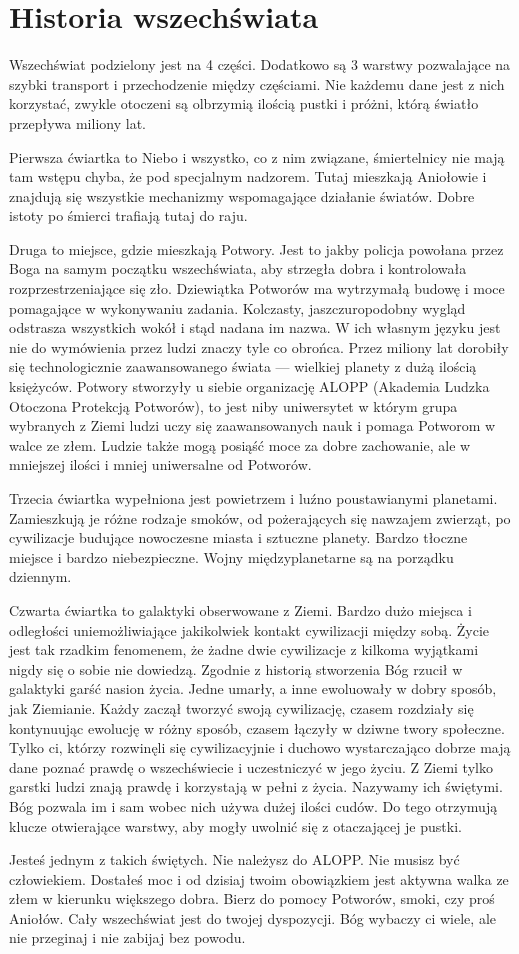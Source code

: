 \chapter{Historia wszechświata}
Wszechświat podzielony jest na 4 części. Dodatkowo są 3 warstwy pozwalające na szybki transport i przechodzenie między częściami.
Nie każdemu dane jest z nich korzystać, zwykle otoczeni są olbrzymią ilością pustki i próżni, którą światło przepływa miliony lat.

Pierwsza ćwiartka to Niebo i wszystko, co z nim związane, śmiertelnicy nie mają tam wstępu chyba, że pod specjalnym nadzorem.
Tutaj mieszkają Aniołowie i znajdują się wszystkie mechanizmy wspomagające działanie światów.
Dobre istoty po śmierci trafiają tutaj do raju.

Druga to miejsce, gdzie mieszkają Potwory.
Jest to jakby policja powołana przez Boga na samym początku wszechświata, aby strzegła dobra i kontrolowała rozprzestrzeniające się zło.
Dziewiątka Potworów ma wytrzymałą budowę i moce pomagające w wykonywaniu zadania.
Kolczasty, jaszczuropodobny wygląd odstrasza wszystkich wokół i stąd nadana im nazwa. W ich własnym języku jest nie do wymówienia przez ludzi znaczy tyle co obrońca.
Przez miliony lat dorobiły się technologicznie zaawansowanego świata --- wielkiej planety z dużą ilością księżyców.
Potwory stworzyły u siebie organizację ALOPP (Akademia Ludzka Otoczona Protekcją Potworów), to jest niby uniwersytet w którym grupa wybranych z Ziemi ludzi uczy się zaawansowanych nauk i pomaga Potworom w walce ze złem.
Ludzie także mogą posiąść moce za dobre zachowanie, ale w mniejszej ilości i mniej uniwersalne od Potworów.

Trzecia ćwiartka wypełniona jest powietrzem i luźno poustawianymi planetami.
Zamieszkują je różne rodzaje smoków, od pożerających się nawzajem zwierząt, po cywilizacje budujące nowoczesne miasta i sztuczne planety.
Bardzo tłoczne miejsce i bardzo niebezpieczne. Wojny międzyplanetarne są na porządku dziennym.

Czwarta ćwiartka to galaktyki obserwowane z Ziemi.
Bardzo dużo miejsca i odległości uniemożliwiające jakikolwiek kontakt cywilizacji między sobą.
Życie jest tak rzadkim fenomenem, że żadne dwie cywilizacje z kilkoma wyjątkami nigdy się o sobie nie dowiedzą.
Zgodnie z historią stworzenia Bóg rzucił w galaktyki garść nasion życia. Jedne umarły, a inne ewoluowały w dobry sposób, jak Ziemianie.
Każdy zaczął tworzyć swoją cywilizację, czasem rozdziały się kontynuując ewolucję w różny sposób, czasem łączyły w dziwne twory społeczne.
Tylko ci, którzy rozwinęli się cywilizacyjnie i duchowo wystarczająco dobrze mają dane poznać prawdę o wszechświecie i uczestniczyć w jego życiu.
Z Ziemi tylko garstki ludzi znają prawdę i korzystają w pełni z życia. Nazywamy ich świętymi.
Bóg pozwala im i sam wobec nich używa dużej ilości cudów. Do tego otrzymują klucze otwierające warstwy, aby mogły uwolnić się z otaczającej je pustki.

Jesteś jednym z takich świętych. Nie należysz do ALOPP. Nie musisz być człowiekiem.
Dostałeś moc i od dzisiaj twoim obowiązkiem jest aktywna walka ze złem w kierunku większego dobra.
Bierz do pomocy Potworów, smoki, czy proś Aniołów. Cały wszechświat jest do twojej dyspozycji.
Bóg wybaczy ci wiele, ale nie przeginaj i nie zabijaj bez powodu.
